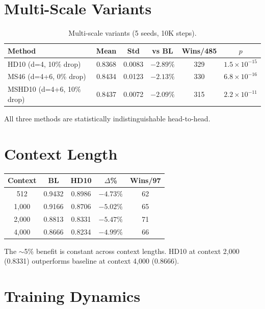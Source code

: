 \documentclass[letterpaper]{article}
\begin{document}
\section{Multi-Scale Variants}
\label{app:multiscale}

\begin{table}[h]
\centering
\caption{Multi-scale variants (5 seeds, 10K steps).}
\small
\begin{tabular}{lccccc}
\toprule
\textbf{Method} & \textbf{Mean} & \textbf{Std} & \textbf{vs BL} & \textbf{Wins/485} & \textbf{$p$} \\
\midrule
HD10 (d=4, 10\% drop) & 0.8368 & 0.0083 & $-2.89\%$ & 329 & $1.5 \times 10^{-15}$ \\
MS46 (d=4+6, 0\% drop) & 0.8434 & 0.0123 & $-2.13\%$ & 330 & $6.8 \times 10^{-16}$ \\
MSHD10 (d=4+6, 10\% drop) & 0.8437 & 0.0072 & $-2.09\%$ & 315 & $2.2 \times 10^{-11}$ \\
\bottomrule
\end{tabular}
\end{table}

All three methods are statistically indistinguishable head-to-head.

\section{Context Length}
\label{app:context}

\begin{table}[h]
\centering
\small
\begin{tabular}{ccccc}
\toprule
\textbf{Context} & \textbf{BL} & \textbf{HD10} & \textbf{$\Delta$\%} & \textbf{Wins/97} \\
\midrule
512 & 0.9432 & 0.8986 & $-4.73\%$ & 62 \\
1,000 & 0.9166 & 0.8706 & $-5.02\%$ & 65 \\
2,000 & 0.8813 & 0.8331 & $-5.47\%$ & 71 \\
4,000 & 0.8666 & 0.8234 & $-4.99\%$ & 66 \\
\bottomrule
\end{tabular}
\end{table}

The ${\sim}$5\% benefit is constant across context lengths. HD10 at context 2,000 (0.8331) outperforms baseline at context 4,000 (0.8666).

\section{Training Dynamics}
\label{app:training}
\end{document}
